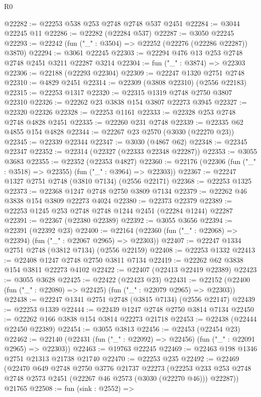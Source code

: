 \begin{lexlean}{R0}
\begin{coremodule}
@22282 := @22253 @538 @253 @2748 @2748 @537 @2451
@22284 := @3044 @22245 @11
@22286 := @22282 (@22284 @537)
@22287 := @3050 @22245
@22293 := @22242 (fun ("_" : @3504) => @22252 (@22276 (@22286 @22287)) @3870)
@22294 := @3061 @22245
@22303 := @22294 @476 @13 @253 @2748 @2748 @2451 @3211 @22287 @3214
@22304 := fun ("_" : @3874) => @22303
@22306 := @22188 (@22293 @22304)
@22309 := @22247 @1320 @2751 @2748
@22310 := @4829 @2451
@22314 := @22309 (@3808 @22310) (@2556 @22183)
@22315 := @22253 @1317
@22320 := @22315 @1319 @2748 @2750 @3807 @22310
@22326 := @22262 @23 @3838 @154 @3807 @22273 @3945
@22327 := @22320 @22326
@22328 := @22253 @1161
@22333 := @22328 @253 @2748 @2748 @4828 @2451
@22335 := @22260 @231 @2748
@22339 := @22335 @62 @4855 @154 @4828
@22344 := @22267 @23 @2570 (@3030 (@22270 @23))
@22345 := @22339 @22344
@22347 := @3030 (@4867 @62)
@22348 := @22345 @22347
@22352 := @22314 (@22327 (@22333 @22348 @22287))
@22353 := @3055 @3683
@22355 := @22352 (@22353 @4827)
@22360 := @22176 (@22306 (fun ("_" : @3518) => @22355) (fun ("_" : @3964) => @22303))
@22367 := @22247 @1327 @2751 @2748 (@3810 @7134) (@2556 @22171)
@22368 := @22253 @1325
@22373 := @22368 @1247 @2748 @2750 @3809 @7134
@22379 := @22262 @46 @3838 @154 @3809 @22273 @4024
@22380 := @22373 @22379
@22389 := @22253 @1245 @253 @2748 @2748 @1244 @2451 (@22284 @1244) @22287
@22391 := @22367 (@22380 @22389)
@22392 := @3055 @3656
@22394 := @22391 (@22392 @23)
@22400 := @22164 (@22360 (fun ("_" : @22068) => @22394) (fun ("_" : @22067 @2965) => @22303))
@22407 := @22247 @1334 @2751 @2748 (@3812 @7134) (@2556 @22159)
@22408 := @22253 @1332
@22413 := @22408 @1247 @2748 @2750 @3811 @7134
@22419 := @22262 @62 @3838 @154 @3811 @22273 @4102
@22422 := @22407 (@22413 @22419 @22389)
@22423 := @3055 @3628
@22425 := @22422 (@22423 @23)
@22431 := @22152 (@22400 (fun ("_" : @22080) => @22425) (fun ("_" : @22079 @2965) => @22303))
@22438 := @22247 @1341 @2751 @2748 (@3815 @7134) (@2556 @22147)
@22439 := @22253 @1339
@22444 := @22439 @1247 @2748 @2750 @3814 @7134
@22450 := @22262 @166 @3838 @154 @3814 @22273 @21718
@22453 := @22438 (@22444 @22450 @22389)
@22454 := @3055 @3813
@22456 := @22453 (@22454 @23)
@22462 := @22140 (@22431 (fun ("_" : @22092) => @22456) (fun ("_" : @22091 @2965) => @22303))
@22463 := @19763 @22245
@22469 := @22463 @198 @1346 @2751 @21313 @21738 @21740
@22470 := @22253 @235
@22492 := @22469
    (@22470
      @649
      @2748
      @2750
      @3776
      @21737
      @22273
      (@22253 @233 @253 @2748 @2748 @2573 @2451 (@22267 @46 @2573 (@3030 (@22270 @46))) @22287))
    @21765
@22508 := fun (sink : @2552) =>

\end{coremodule}
\end{lexlean}
